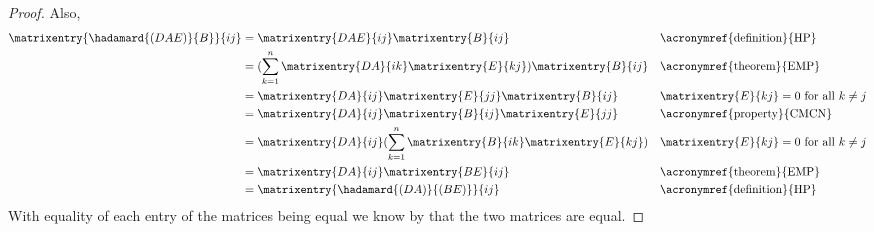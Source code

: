 \begin{proof}
Also, 
\begin{align*}
\matrixentry{\hadamard{(DAE)}{B}}{ij}
&= 
\matrixentry{DAE}{ij} \matrixentry{B}{ij}
&& \text{\acronymref{definition}{HP}} \\
%
&= 
(\sum_{k=1}^n \matrixentry{DA}{ik} \matrixentry{E}{kj}) \matrixentry{B}{ij}
&& \text{\acronymref{theorem}{EMP}} \\
%
&=
\matrixentry{DA}{ij} \matrixentry{E}{jj} \matrixentry{B}{ij}
&& \matrixentry{E}{kj} = 0 \text{ for all } k \neq j \\
%
&=
\matrixentry{DA}{ij} \matrixentry{B}{ij} \matrixentry{E}{jj}
&& \text{\acronymref{property}{CMCN}} \\
%
&=
\matrixentry{DA}{ij} (\sum_{k=1}^n \matrixentry{B}{ik} \matrixentry{E}{kj} )
&& \matrixentry{E}{kj} = 0 \text{ for all } k \neq j \\
%
&=
\matrixentry{DA}{ij} \matrixentry{BE}{ij}
&& \text{\acronymref{theorem}{EMP}} \\
%
&=
\matrixentry{\hadamard{(DA)}{(BE)}}{ij}
&& \text{\acronymref{definition}{HP}} 
\end{align*}
With equality of each entry of the matrices being equal we know by  that the two matrices are equal.
\end{proof}
%
